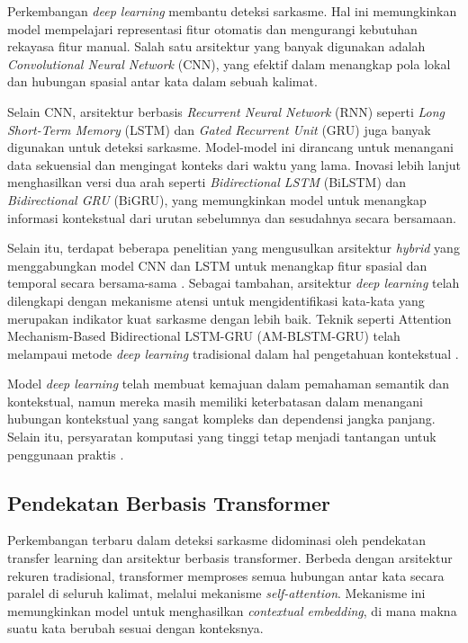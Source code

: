 Perkembangan \textit{deep learning} membantu deteksi sarkasme. Hal ini memungkinkan model mempelajari representasi fitur otomatis dan mengurangi kebutuhan rekayasa fitur manual. Salah satu arsitektur yang banyak digunakan adalah \textit{Convolutional Neural Network} (CNN), yang efektif dalam menangkap pola lokal dan hubungan spasial antar kata dalam sebuah kalimat.

Selain CNN, arsitektur berbasis \textit{Recurrent Neural Network} (RNN) seperti \textit{Long Short-Term Memory} (LSTM) dan \textit{Gated Recurrent Unit} (GRU) juga banyak digunakan untuk deteksi sarkasme. Model-model ini dirancang untuk menangani data sekuensial dan mengingat konteks dari waktu yang lama. Inovasi lebih lanjut menghasilkan versi dua arah seperti \textit{Bidirectional LSTM} (BiLSTM) dan \textit{Bidirectional GRU} (BiGRU), yang memungkinkan model untuk menangkap informasi kontekstual dari urutan sebelumnya dan sesudahnya secara bersamaan.

Selain itu, terdapat beberapa penelitian yang mengusulkan arsitektur \textit{hybrid} yang menggabungkan model CNN dan LSTM untuk menangkap fitur spasial dan temporal secara bersama-sama \cite{prakash2025sarcasm}. Sebagai tambahan, arsitektur \textit{deep learning} telah dilengkapi dengan mekanisme atensi untuk mengidentifikasi kata-kata yang merupakan indikator kuat sarkasme dengan lebih baik. Teknik seperti Attention Mechanism-Based Bidirectional LSTM-GRU (AM-BLSTM-GRU) telah melampaui metode \textit{deep learning} tradisional dalam hal pengetahuan kontekstual \cite{dhumpati2025sarcasm}.

Model \textit{deep learning} telah membuat kemajuan dalam pemahaman semantik dan kontekstual, namun mereka masih memiliki keterbatasan dalam menangani hubungan kontekstual yang sangat kompleks dan dependensi jangka panjang. Selain itu, persyaratan komputasi yang tinggi tetap menjadi tantangan untuk penggunaan praktis \cite{dhumpati2025sarcasm}.

\subsection{Pendekatan Berbasis Transformer}

Perkembangan terbaru dalam deteksi sarkasme didominasi oleh pendekatan transfer learning dan arsitektur berbasis transformer. Berbeda dengan arsitektur rekuren tradisional, transformer memproses semua hubungan antar kata secara paralel di seluruh kalimat, melalui mekanisme \textit{self-attention}. Mekanisme ini memungkinkan model untuk menghasilkan \textit{contextual embedding}, di mana makna suatu kata berubah sesuai dengan konteksnya.

